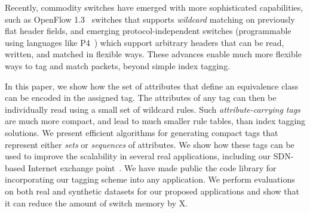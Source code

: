 Recently, commodity switches have emerged with more sophisticated capabilities, such as OpenFlow 1.3~\cite{of13} switches that supports \emph{wildcard} matching on previously flat header fields, and emerging protocol-independent switches (programmable using languages like P4~\cite{P4}) which support arbitrary headers that can be read, written, and matched in flexible ways.  These advances enable much more flexible ways to tag and match packets, beyond simple index tagging. 




In this paper, we show how the set of attributes that define an
equivalence class can be encoded in the assigned tag. The attributes of
any tag can then be individually read using a small set of wildcard
rules.  Such \emph{attribute-carrying tags} are much more compact, and
lead to much smaller rule tables, than index tagging solutions.  We
present efficient algorithms for generating compact tags that represent
either \emph{sets} or \emph{sequences} of attributes.  We show how these
tags can be used to improve the scalability in several real
applications, including our SDN-based Internet exchange
point~\cite{isdx}.  We have made public the code library for
incorporating our tagging scheme into any application. We perform
evaluations on both real and synthetic datasets for our proposed
applications and show that it can reduce the amount of switch memory by
X.  

